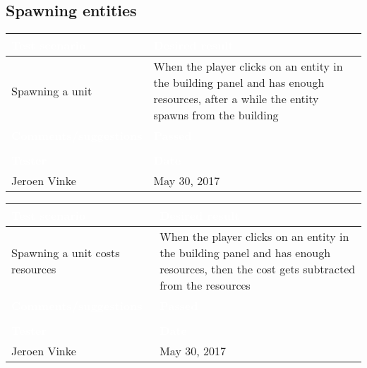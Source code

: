 \subsection{Spawning entities}

\begin{tabularx}{\textwidth}{|X|X|}
\hline
\rowcolor{lightgray}\textcolor{white}{\textbf{Test scenario}} &
\textcolor{white}{\textbf{Desired result}}       
\\\hline
Spawning a unit & When the player clicks on an entity in the building panel and has enough resources, after a while the entity spawns from the building
\\\hline
\rowcolor{lightgray}\textcolor{white}{\textbf{Comments/suggestions}} & 
\textcolor{white}{\textbf{Passed}}
\\\hline
 & \cellcolor{green}                       
\\\hline
\rowcolor{lightgray}\textcolor{white}{\textbf{Tester}} & 
\textcolor{white}{\textbf{Date}}               
\\\hline
Jeroen Vinke & May 30, 2017     
                          		 
\\\hline
\end{tabularx}


\begin{tabularx}{\textwidth}{|X|X|}
\hline
\rowcolor{lightgray}\textcolor{white}{\textbf{Test scenario}} &
\textcolor{white}{\textbf{Desired result}}       
\\\hline
Spawning a unit costs resources & When the player clicks on an entity in the building panel and has enough resources, then the cost gets subtracted from the resources
\\\hline
\rowcolor{lightgray}\textcolor{white}{\textbf{Comments/suggestions}} & 
\textcolor{white}{\textbf{Passed}}
\\\hline
 & \cellcolor{green}                       
\\\hline
\rowcolor{lightgray}\textcolor{white}{\textbf{Tester}} & 
\textcolor{white}{\textbf{Date}}               
\\\hline
Jeroen Vinke & May 30, 2017     
                          		 
\\\hline
\end{tabularx}


